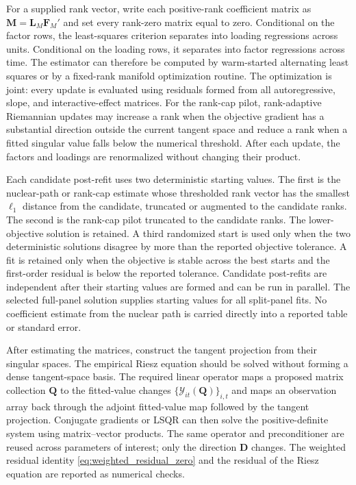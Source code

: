 \documentclass[11pt]{article}
\numberwithin{equation}{section}
\theoremstyle{remark}
\newcommand{\bD}{\bm D}
\newcommand{\bM}{\bm M}
\newcommand{\bQ}{\bm Q}
\begin{document}
For a supplied rank vector, write each positive-rank coefficient matrix as $\bM=\bm L_M\bm F_M'$ and set every rank-zero matrix equal to zero. Conditional on the factor rows, the least-squares criterion separates into loading regressions across units. Conditional on the loading rows, it separates into factor regressions across time. The estimator can therefore be computed by warm-started alternating least squares or by a fixed-rank manifold optimization routine. The optimization is joint: every update is evaluated using residuals formed from all autoregressive, slope, and interactive-effect matrices. For the rank-cap pilot, rank-adaptive Riemannian updates may increase a rank when the objective gradient has a substantial direction outside the current tangent space and reduce a rank when a fitted singular value falls below the numerical threshold. After each update, the factors and loadings are renormalized without changing their product.

Each candidate post-refit uses two deterministic starting values. The first is the nuclear-path or rank-cap estimate whose thresholded rank vector has the smallest $\ell_1$ distance from the candidate, truncated or augmented to the candidate ranks. The second is the rank-cap pilot truncated to the candidate ranks. The lower-objective solution is retained. A third randomized start is used only when the two deterministic solutions disagree by more than the reported objective tolerance. A fit is retained only when the objective is stable across the best starts and the first-order residual is below the reported tolerance. Candidate post-refits are independent after their starting values are formed and can be run in parallel. The selected full-panel solution supplies starting values for all split-panel fits. No coefficient estimate from the nuclear path is carried directly into a reported table or standard error.

After estimating the matrices, construct the tangent projection from their singular spaces. The empirical Riesz equation should be solved without forming a dense tangent-space basis. The required linear operator maps a proposed matrix collection $\bQ$ to the fitted-value changes $\{\mathcal Y_{it}(\bQ)\}_{i,t}$ and maps an observation array back through the adjoint fitted-value map followed by the tangent projection. Conjugate gradients or LSQR can then solve the positive-definite system using matrix--vector products. The same operator and preconditioner are reused across parameters of interest; only the direction $\bD$ changes. The weighted residual identity \eqref{eq:weighted_residual_zero} and the residual of the Riesz equation are reported as numerical checks.
\end{document}
